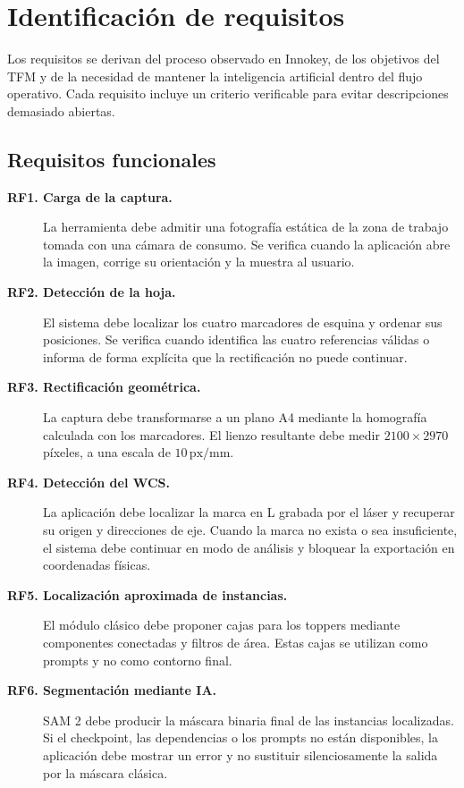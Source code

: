 \chapter{Identificación de requisitos}
\label{cap:requisitos}

Los requisitos se derivan del proceso observado en Innokey, de los objetivos del TFM y de la necesidad de mantener la inteligencia artificial dentro del flujo operativo. Cada requisito incluye un criterio verificable para evitar descripciones demasiado abiertas.

\section{Requisitos funcionales}

\begin{description}
    \item[\textbf{RF1. Carga de la captura.}] La herramienta debe admitir una fotografía estática de la zona de trabajo tomada con una cámara de consumo. Se verifica cuando la aplicación abre la imagen, corrige su orientación y la muestra al usuario.

    \item[\textbf{RF2. Detección de la hoja.}] El sistema debe localizar los cuatro marcadores de esquina y ordenar sus posiciones. Se verifica cuando identifica las cuatro referencias válidas o informa de forma explícita que la rectificación no puede continuar.

    \item[\textbf{RF3. Rectificación geométrica.}] La captura debe transformarse a un plano A4 mediante la homografía calculada con los marcadores. El lienzo resultante debe medir $2100 \times 2970$ píxeles, a una escala de $10\,\text{px/mm}$.

    \item[\textbf{RF4. Detección del WCS.}] La aplicación debe localizar la marca en L grabada por el láser y recuperar su origen y direcciones de eje. Cuando la marca no exista o sea insuficiente, el sistema debe continuar en modo de análisis y bloquear la exportación en coordenadas físicas.

    \item[\textbf{RF5. Localización aproximada de instancias.}] El módulo clásico debe proponer cajas para los toppers mediante componentes conectadas y filtros de área. Estas cajas se utilizan como prompts y no como contorno final.

    \item[\textbf{RF6. Segmentación mediante IA.}] SAM 2 debe producir la máscara binaria final de las instancias localizadas. Si el checkpoint, las dependencias o los prompts no están disponibles, la aplicación debe mostrar un error y no sustituir silenciosamente la salida por la máscara clásica.


\end{description}
